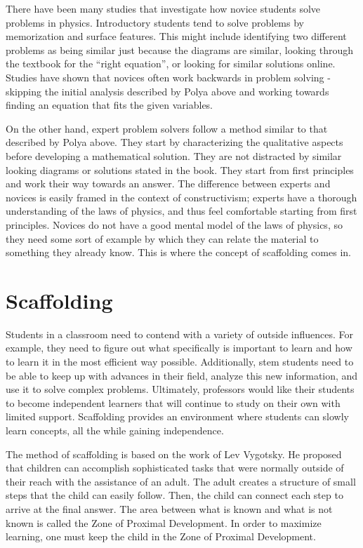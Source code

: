 There have been many studies that investigate how novice students solve problems in physics. Introductory students tend to solve problems by memorization and surface features. This might include identifying two different problems as being similar just because the diagrams are similar, looking through the textbook for the ``right equation'', or looking for similar solutions online\cite{maloney1994, walsh2007}. Studies have shown that novices often work backwards in problem solving - skipping the initial analysis described by Polya above and working towards finding an equation that fits the given variables.

On the other hand, expert problem solvers follow a method similar to that described by Polya above. They start by characterizing the qualitative aspects before developing a mathematical solution. They are not distracted by similar looking diagrams or solutions stated in the book. They start from first principles and work their way towards an answer\cite{larkin1980}. The difference between experts and novices is easily framed in the context of constructivism; experts have a thorough understanding of the laws of physics, and thus feel comfortable starting from first principles. Novices do not have a good mental model of the laws of physics, so they need some sort of example by which they can relate the material to something they already know. This is where the concept of scaffolding comes in.

\section{Scaffolding}

Students in a classroom need to contend with a variety of outside influences. For example, they need to figure out what specifically is important to learn and how to learn it in the most efficient way possible. Additionally, \gls{stem} students need to be able to keep up with advances in their field, analyze this new information, and use it to solve complex problems. Ultimately, professors would like their students to become independent learners that will continue to study on their own with limited support. Scaffolding provides an environment where students can slowly learn concepts, all the while gaining independence\cite{larkin2002}.

The method of scaffolding is based on the work of Lev Vygotsky. He proposed that children can accomplish sophisticated tasks that were normally outside of their reach with the assistance of an adult. The adult creates a structure of small steps that the child can easily follow. Then, the child can connect each step to arrive at the final answer. The area between what is known and what is not known is called the Zone of Proximal Development\cite{davey2006}. In order to maximize learning, one must keep the child in the Zone of Proximal Development.

